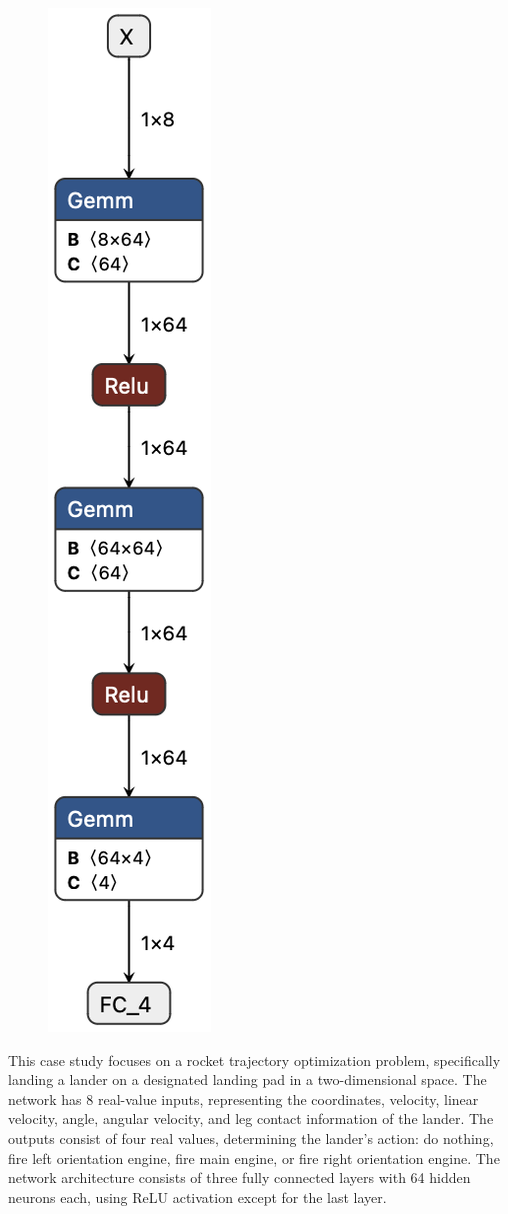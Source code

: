 \begin{itemize}
\begin{figure}[H]
        \includegraphics[scale=0.4]{"Chapter7/img/lunarlander.png"}
    \end{figure}
    This case study focuses on a rocket trajectory optimization problem, specifically landing a lander on a designated landing pad in a two-dimensional space. 
    The network has 8 real-value inputs, representing the coordinates, velocity, linear velocity, angle, angular velocity, and leg contact information of the lander. 
    The outputs consist of four real values, determining the lander's action: do nothing, fire left orientation engine, fire main engine, or fire right orientation engine. 
    The network architecture consists of three fully connected layers with 64 hidden neurons each, using ReLU activation except for the last layer.
    
\end{itemize}

